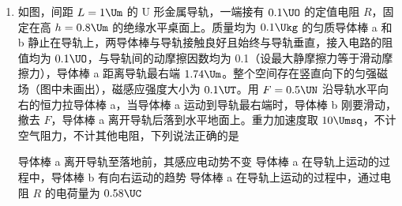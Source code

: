 \documentclass[\gkver]{gaokaozhenti}
\begin{document}
\begin{enumerate}
{飞行器以 $v_{2} = 5\Ums$ 向上匀速时，设最大推力为 $F_{m}$

$F_{m} = Mg + kv_{2}^{2} = Mg + k \times 25$

联立可得

$F_{m} = 1.25Mg$，$k = \frac{Mg}{100}$

A 错误；

B．飞行器以 $v_{3} = 5\Ums$ 匀速水平飞行时

$F = \sqrt{(Mg)^{2} + (kv_{3})^{2}} = \frac{\sqrt{17}}{4}Mg$

B 正确；

C．发动机以最大推力推动飞行器匀速水平飞行时

$f = \sqrt{F_{m}^{2} - (Mg)^{2}} = \frac{3}{4}Mg = kv_{4}^{2}$

解得 $v_{4} = 5\sqrt{3}\Ums$。C 正确；

D．当飞行器最大推力向下，以 $v_{5} = 5\Ums$ 的速率向上减速飞行时，其加速度向下达到最大值

$F_{m} + Mg + kv_{5}^{2} = Ma_{m}$

解得 $a_{m} = 2.5g$。D 错误。

故选 BC。
}

\item
如图，间距 $L = 1\Um$ 的 U 形金属导轨，一端接有 $0.1\UO$ 的定值电阻 $R$，固定在高 $h = 0.8\Um$ 的绝缘水平桌面上。质量均为 $0.1\Ukg$ 的匀质导体棒 a 和 b 静止在导轨上，两导体棒与导轨接触良好且始终与导轨垂直，接入电路的阻值均为 $0.1\UO$，与导轨间的动摩擦因数均为 0.1（设最大静摩擦力等于滑动摩擦力），导体棒 a 距离导轨最右端 $1.74\Um$。整个空间存在竖直向下的匀强磁场（图中未画出），磁感应强度大小为 $0.1\UT$。用 $F = 0.5\UN$ 沿导轨水平向右的恒力拉导体棒 a，当导体棒 a 运动到导轨最右端时，导体棒 b 刚要滑动，撤去 $F$，导体棒 a 离开导轨后落到水平地面上。重力加速度取 $10\Umsq$，不计空气阻力，不计其他电阻，下列说法正确的是


{导体棒 a 离开导轨至落地前，其感应电动势不变}
{导体棒 a 在导轨上运动的过程中，导体棒 b 有向右运动的趋势}
{导体棒 a 在导轨上运动的过程中，通过电阻 $R$ 的电荷量为 $0.58\UC$}

\end{enumerate}
\end{document}
